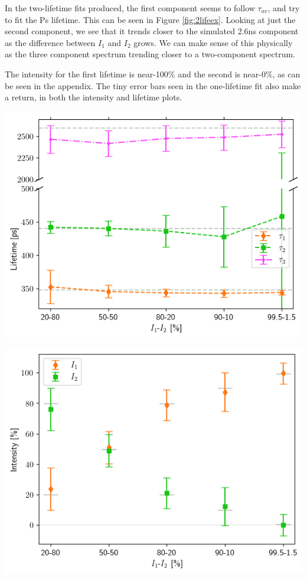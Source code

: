 In the two-lifetime fits produced, the first component seems to follow $\tau_{av}$, and try to fit the Ps lifetime. This can be seen in Figure \ref{fig:2lifeex}. Looking at just the second component, we see that it trends closer to the simulated 2.6ns component as the difference between $I_1$ and $I_2$ grows. We can make sense of this physically as the three component spectrum trending closer to a two-component spectrum.

The intensity for the first lifetime is near-100\% and the second is near-0\%, as can be seen in the appendix. The tiny error bars seen in the one-lifetime fit also make a return, in both the intensity and lifetime plots.

 
\begin{minipage}{.45\linewidth}
     
    \includegraphics[width=\linewidth]{Batch 7/348-440/output/3 life/lifetimes.png}    
    \label{fig:3lifeex}
\end{minipage}
\hfill
\begin{minipage}{.45\linewidth}
     
    \includegraphics[width=\linewidth]{Batch 7/348-440/output/3 life/intensities.png}    
    \label{fig:3intex}
\end{minipage}
 

